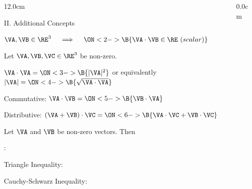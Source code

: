 \begin{frame}
\begin{columns}
\begin{column}{12.0cm}

{II. Additional Concepts}

\vspace{0.2cm}

\scriptsize

\NOTE

\vspace{0.1cm}

\OBUL $\VA,\VB \in \RE^3 \quad \implies \quad \ON<2->{\B{\VA \cdot \VB \in \RE \,\, (scalar)}}$ \\

\vspace{0.7cm}

\PROP Let $\VA, \VB, \VC \in \RE^3$ be non-zero.

\vspace{0.2cm}

\OBUL $\VA \cdot \VA = \ON<3->{\B{|\VA|^2}}$ \quad or equivalently \quad $|\VA| = \ON<4->{\B{\sqrt{\VA \cdot \VA}}}$

\vspace{0.2cm}

\OBUL Commutative: $\VA \cdot \VB = \ON<5->{\B{\VB \cdot \VA}}$

\vspace{0.2cm}

\OBUL Distributive: $(\VA + \VB) \cdot \VC = \ON<6->{\B{\VA \cdot \VC + \VB \cdot \VC}}$

\vspace{0.7cm}

\THM Let $\VA$ and $\VB$ be non-zero vectors.  Then
\begin{center}
\end{center}

\vspace{0.2cm}

:	

\vspace{0.2cm}

\OBUL Triangle Inequality: \quad {}

\vspace{0.2cm}

\OBUL Cauchy-Schwarz Inequality: \quad {}

\vspace{0.7cm}

\end{column}
\begin{column}{0.0cm}\end{column}
\end{columns}
\end{frame}

